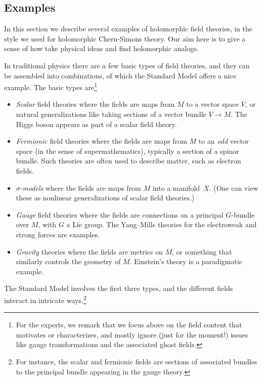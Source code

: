 \documentclass[11pt]{amsart}
\begin{document}
\subsection{Examples}
\label{sec: ex of theories}

In this section we describe several examples of holomorphic field theories,
in the style we used for holomorphic Chern-Simons theory.
Our aim here is to give a sense of how take physical ideas and find holomorphic analogs.

In traditional physics there are a few basic types of field theories, 
and they can be assembled into combinations,
of which the Standard Model offers a nice example.
The basic types are\footnote{For the experts, we remark that we focus above on the field content that motivates or characterizes, and mostly ignore (just for the moment!) issues like gauge transformations and the associated ghost fields.}
\begin{itemize}
\item {\em Scalar} field theories where the fields are maps from $M$ to a vector space $V$, or natural generalizations like taking sections of a vector bundle $V \to M$. The Higgs boson appears as part of a scalar field theory.
\item {\em Fermionic} field theories where the fields are maps from $M$ to an {\em odd} vector space (in the sense of supermathematics), typically a section of a spinor bundle. Such theories are often used to describe matter, such as electron fields.
\item $\sigma$-{\em models} where the fields are maps from $M$ into a manifold~$X$. (One can view these as nonlinear generalizations of scalar field theories.)
\item {\em Gauge} field theories where the fields are connections on a principal $G$-bundle over $M$, with $G$ a Lie group. The Yang--Mills theories for the electroweak and strong forces are examples.
\item {\em Gravity} theories where the fields are metrics on $M$, or something that similarly controls the geometry of $M$. Einstein's theory is a paradigmatic example.
\end{itemize}
The Standard Model involves the first three types,
and the different fields interact in intricate ways.\footnote{For instance, the scalar and fermionic fields are sections of associated bundles to the principal bundle appearing in the gauge theory.}
\end{document}

